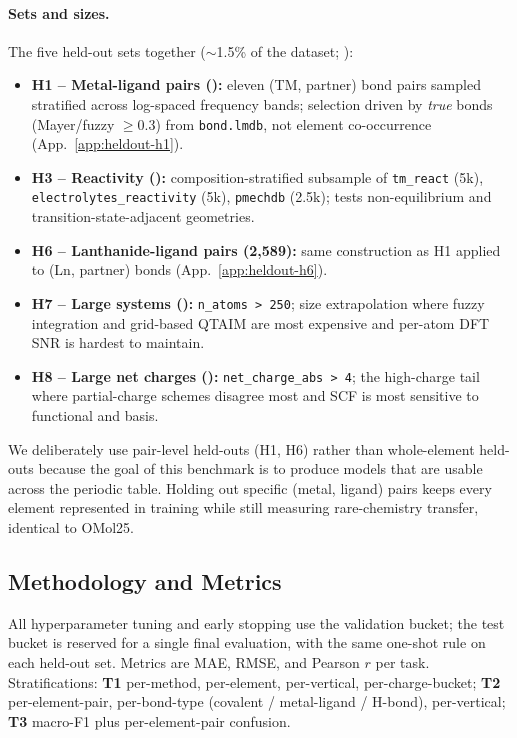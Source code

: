 \paragraph{Sets and sizes.}
The five held-out sets together  ($\sim$1.5\% of the dataset; ):

\begin{itemize}
  \item \textbf{H1 -- Metal-ligand pairs ():} eleven (TM, partner) bond pairs sampled stratified across log-spaced frequency bands; selection driven by \emph{true} bonds (Mayer/fuzzy $\geq 0.3$) from \texttt{bond.lmdb}, not element co-occurrence (App.~\ref{app:heldout-h1}).
  \item \textbf{H3 -- Reactivity ():} composition-stratified subsample of \texttt{tm\_react} (5k), \texttt{electrolytes\_reactivity} (5k), \texttt{pmechdb} (2.5k); tests non-equilibrium and transition-state-adjacent geometries.
  \item \textbf{H6 -- Lanthanide-ligand pairs (2{,}589):} same construction as H1 applied to (Ln, partner) bonds (App.~\ref{app:heldout-h6}).
  \item \textbf{H7 -- Large systems ():} \texttt{n\_atoms > 250}; size extrapolation where fuzzy integration and grid-based QTAIM are most expensive and per-atom DFT SNR is hardest to maintain.
  \item \textbf{H8 -- Large net charges ():} \texttt{net\_charge\_abs > 4}; the high-charge tail where partial-charge schemes disagree most and SCF is most sensitive to functional and basis.
\end{itemize}


We deliberately use pair-level held-outs (H1, H6) rather than
whole-element held-outs because the goal of this benchmark is to produce
models that are usable across the periodic table. Holding out specific (metal, ligand) pairs keeps every element
represented in training while still measuring rare-chemistry transfer,
identical to OMol25.


\subsection{Methodology and Metrics}
\label{sec:eval-method}

All hyperparameter tuning and early stopping use the validation bucket; the test
bucket is reserved for a single final evaluation, with the same one-shot rule on
each held-out set. Metrics are MAE, RMSE, and Pearson $r$ per task. Stratifications:
\textbf{T1} per-method, per-element, per-vertical, per-charge-bucket; \textbf{T2}
per-element-pair, per-bond-type (covalent / metal-ligand / H-bond), per-vertical;
\textbf{T3} macro-F1 plus per-element-pair confusion.
